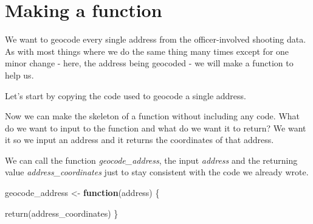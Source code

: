 \documentclass[
  12pt,
  openany]{book}
\newenvironment{Shaded}{\begin{snugshade}}{\end{snugshade}}
\newcommand{\CommentTok}[1]{\textcolor[rgb]{0.37,0.37,0.37}{\textit{#1}}}
\newcommand{\ControlFlowTok}[1]{\textcolor[rgb]{0.27,0.27,0.27}{\textbf{#1}}}
\newcommand{\DecValTok}[1]{\textcolor[rgb]{0.06,0.06,0.06}{#1}}
\newcommand{\FunctionTok}[1]{\textcolor[rgb]{0,0,0}{#1}}
\newcommand{\NormalTok}[1]{#1}
\newcommand{\OtherTok}[1]{\textcolor[rgb]{0.37,0.37,0.37}{#1}}
\newcommand{\SpecialCharTok}[1]{\textcolor[rgb]{0,0,0}{#1}}
\newcommand{\StringTok}[1]{\textcolor[rgb]{0.5,0.5,0.5}{#1}}
\begin{document}
\hypertarget{making-a-function-1}{%
\section{Making a function}\label{making-a-function-1}}

We want to geocode every single address from the officer-involved shooting data. As with most things where we do the same thing many times except for one minor change - here, the address being geocoded - we will make a function to help us.

Let's start by copying the code used to geocode a single address.

\begin{Shaded}
\end{Shaded}

Now we can make the skeleton of a function without including any code. What do we want to input to the function and what do we want it to return? We want it so we input an address and it returns the coordinates of that address.

We can call the function \emph{geocode\_address}, the input \emph{address} and the returning value \emph{address\_coordinates} just to stay consistent with the code we already wrote.

\begin{Shaded}
\begin{Highlighting}[]
\NormalTok{geocode\_address }\OtherTok{\textless{}{-}} \ControlFlowTok{function}\NormalTok{(address) \{}
   
   \FunctionTok{return}\NormalTok{(address\_coordinates)}
\NormalTok{\}}
\end{Highlighting}
\end{Shaded}
\end{document}
